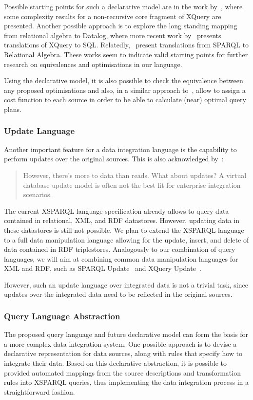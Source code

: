 Possible starting points for such a declarative model are in the work by~\citet{Koch:2006aa}, where some complexity
results for a non-recursive core fragment of XQuery are presented.
%
Another possible approach is to explore the long standing mapping from relational algebra to Datalog, where more recent
work by~\citet{GrustMayrRittinger:2010aa} presents translations of XQuery to SQL.
%
Relatedly,~\citet{Polleres:2007aa,AnglesGutierrez:2008aa} present translations from SPARQL to Relational Algebra. These
works seem to indicate valid starting points for further research on equivalences and optimisations in our language.

Using the declarative model, it is also possible to check the equivalence between any proposed optimisations and also,
in a similar approach to~\citet{LevyRajaramanOrdille:1996aa}, allow to assign a cost function to each source in order to
be able to calculate (near) optimal query plans.



\subsubsection*{Update Language}
%
Another important feature for a data integration language is the capability to perform updates over the original
sources.  This is also acknowledged by~\citet{HalevyAshishBitton:2005aa}:
\begin{quote}
  However, there's more to data than reads. What about updates? A virtual database update model is often not the best
  fit for enterprise integration scenarios.
\end{quote}
%
The current XSPARQL language specification already allows to query data contained in relational, \ac{XML}, and \ac{RDF}
datastores.  However, updating data in these datastores is still not possible.  
%
We plan to extend the XSPARQL language to a full data manipulation language allowing for the update, insert, and delete
of data contained in RDF triplestores.
%
Analogously to our combination of query languages, we will aim at combining common data
manipulation languages for XML and RDF, such as SPARQL Update~\cite{GearonPassantPolleres:2012aa} and XQuery
Update~\cite{RobieChamberlinDyck:2011aa}.

However, such an update language over integrated data is not a trivial task, since updates over the integrated data need
to be reflected in the original sources.


\subsubsection*{Query Language Abstraction}
%
The proposed query language and future declarative model can form the basis for a more complex data integration system.
One possible approach is to devise a declarative representation for data sources, along with rules that specify how to
integrate their data.
%
Based on this declarative abstraction, it is possible to provided automated mappings from the source descriptions and
transformation rules into XSPARQL queries, thus implementing the data integration process in a straightforward fashion.

